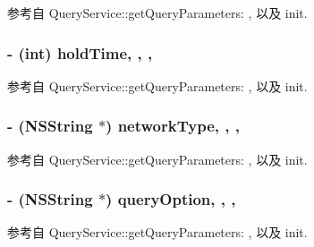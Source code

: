 参考自 Query\-Service\-::get\-Query\-Parameters\-: , 以及 init.

\hypertarget{interface_query_parameters_a66303e1291da38620e0251c251ec970b}{
\subsubsection[{hold\-Time}]{\setlength{\rightskip}{0pt plus 5cm}-\/ (int) hold\-Time\hspace{0.3cm}{\ttfamily [read]}, {\ttfamily [write]}, {\ttfamily [atomic]}, {\ttfamily [assign]}}}\label{interface_query_parameters_a66303e1291da38620e0251c251ec970b}


参考自 Query\-Service\-::get\-Query\-Parameters\-: , 以及 init.

\hypertarget{interface_query_parameters_a97094cdc3ba9da5c8b62b9c1b03fccfd}{
\subsubsection[{network\-Type}]{\setlength{\rightskip}{0pt plus 5cm}-\/ (N\-S\-String $\ast$) network\-Type\hspace{0.3cm}{\ttfamily [read]}, {\ttfamily [write]}, {\ttfamily [atomic]}, {\ttfamily [copy]}}}\label{interface_query_parameters_a97094cdc3ba9da5c8b62b9c1b03fccfd}


参考自 Query\-Service\-::get\-Query\-Parameters\-: , 以及 init.

\hypertarget{interface_query_parameters_a62aa18d0e7ff37366e5b98491fd61068}{
\subsubsection[{query\-Option}]{\setlength{\rightskip}{0pt plus 5cm}-\/ (N\-S\-String $\ast$) query\-Option\hspace{0.3cm}{\ttfamily [read]}, {\ttfamily [write]}, {\ttfamily [atomic]}, {\ttfamily [copy]}}}\label{interface_query_parameters_a62aa18d0e7ff37366e5b98491fd61068}


参考自 Query\-Service\-::get\-Query\-Parameters\-: , 以及 init.

